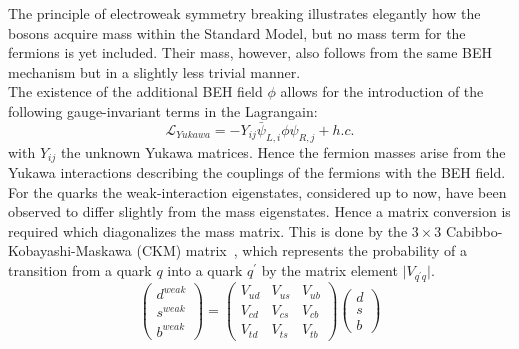 The principle of electroweak symmetry breaking illustrates elegantly how the bosons acquire mass within the Standard Model, but no mass term for the fermions is yet included.
Their mass, however, also follows from the same BEH mechanism but in a slightly less trivial manner. %
\\
The existence of the additional BEH field $\phi$ allows for the introduction of the following gauge-invariant terms in the Lagrangain:
\begin{equation}
 \mathcal{L}_{Yukawa} = - Y_{ij} \bar{\psi}_{L,i} \phi \psi_{R,j} + h.c. 
\end{equation}
with $Y_{ij}$ the unknown Yukawa matrices. Hence the fermion masses arise from the Yukawa interactions describing the couplings of the fermions with the BEH field.
\\

For the quarks the weak-interaction eigenstates, considered up to now, have been observed to differ slightly from the mass eigenstates. Hence a matrix conversion is required which diagonalizes the mass matrix. This is done by the $3 \times3$ Cabibbo-Kobayashi-Maskawa (CKM) matrix~\cite{?}, which represents the probability of a transition from a quark $q$ into a quark $q^{'}$ by the matrix element $\vert V_{q^{'}q} \vert$.
\begin{equation}
 \begin{pmatrix}
  d^{weak} \\ s^{weak} \\ b^{weak} 
 \end{pmatrix}
 = \begin{pmatrix}
    V_{ud} & V_{us} & V_{ub} \\ V_{cd} & V_{cs} & V_{cb} \\ V_{td} & V_{ts} & V_{tb}
   \end{pmatrix}
   \begin{pmatrix}
    d \\ s \\ b
   \end{pmatrix}
\end{equation}

